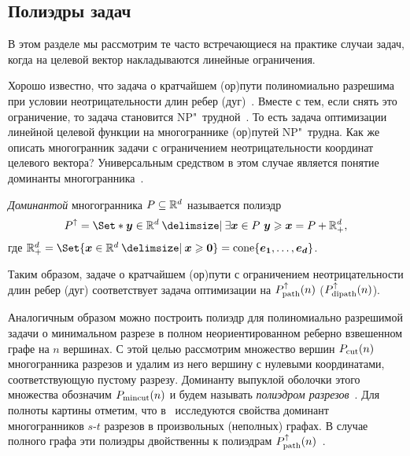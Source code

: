 \subsection{Полиэдры задач}
\label{subsec:polyhedra}

В этом разделе мы рассмотрим те часто встречающиеся на практике случаи задач, когда на целевой вектор накладываются линейные ограничения. 

Хорошо известно, что задача о кратчайшем (ор)пути полиномиально разрешима при условии неотрицательности длин ребер (дуг)~\cite{Dijkstra:1959}.
Вместе с тем, если снять это ограничение, то задача становится NP"~трудной~\cite{Garey:1982}.
То есть задача оптимизации линейной целевой функции на многограннике (ор)путей NP"~трудна.
Как же описать многогранник задачи с ограничением неотрицательности координат целевого вектора?
Универсальным средством в этом случае является понятие доминанты многогранника~\cite{SchrijverCO:2003}.

\emph{Доминантой} многогранника $P \subseteq \mathbb{R}^d$ называется полиэдр
\[
P^{\uparrow} = \Set*{\bm{y} \in \R^d \given \exists \bm{x} \in P \ \bm{y} \ge \bm{x}} = P + \R^d_+,
\]
где $\R^d_+ = \Set{\bm{x} \in \R^d \given \bm{x} \ge \bm{0}} = \cone\{\bm{e_1}, \dots, \bm{e_d}\}$.


Таким образом, задаче о кратчайшем (ор)пути с ограничением неотрицательности длин ребер (дуг) соответствует задача оптимизации на $P_{\textup{path}}^{\uparrow}(n)$ ($P_{\textup{dipath}}^{\uparrow}(n)$).

Аналогичным образом можно построить полиэдр для полиномиально разрешимой задачи о минимальном разрезе в полном неориентированном реберно взвешенном графе на $n$ вершинах.
С этой целью рассмотрим множество вершин $P_{\textup{cut}}(n)$ многогранника разрезов и удалим из него вершину с нулевыми координатами, соответствующую пустому разрезу.
Доминанту выпуклой оболочки этого множества обозначим $P_{\textup{mincut}}(n)$
и будем называть \emph{полиэдром разрезов}~\cite{Conforti:2004}. 
Для полноты картины отметим, что в~\cite{Skutella:2010} исследуются свойства доминант многогранников $s$-$t$ разрезов в произвольных (неполных) графах.
В случае полного графа эти полиэдры двойственны к полиэдрам $P_{\textup{path}}^{\uparrow}(n)$~\cite{SchrijverCO:2003}.

